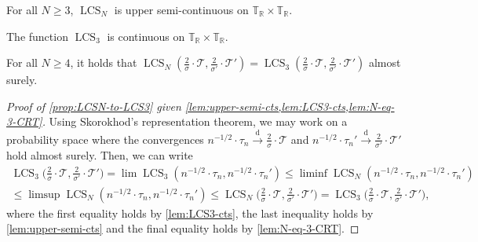 \documentclass[11pt,reqno]{amsart}
\newcommand{\R}{\mathbb{R}}
\newcommand{\bbT}{\mathbb{T}}
\newcommand{\1}{\mathbf{1}}
\newcommand{\0}{\mathbf{0}}
\newcommand{\sT}{\mathscr{T}}
\newcommand{\convdist}{\ensuremath{\stackrel{\mathrm{d}}{\rightarrow}}}
\newcommand{\LCS}{\operatorname{LCS}}
\begin{document}
\begin{lem}\label{lem:upper-semi-cts}
    For all $N\geq 3$, $\LCS_N$ is upper semi-continuous on $\bbT_\R\times\bbT_\R$.
\end{lem}
\begin{lem}\label{lem:LCS3-cts}
The function $\LCS_3$ is continuous on $\bbT_\R\times\bbT_\R$.
\end{lem}
\begin{lem}\label{lem:N-eq-3-CRT} 
For all $N\geq 4$, it holds that $\LCS_N(\frac{2}{\sigma}\cdot\sT,\frac{2}{\sigma'}\cdot\sT')=\LCS_3(\frac{2}{\sigma}\cdot\sT,\frac{2}{\sigma'}\cdot\sT')$ almost surely.
\end{lem}




\begin{proof}[Proof of \cref{prop:LCSN-to-LCS3} given \cref{lem:upper-semi-cts,lem:LCS3-cts,lem:N-eq-3-CRT}] Using Skorokhod's representation theorem, we may work on a probability space where the convergences $n^{-1/2}\cdot\tau_n \convdist \frac{2}{\sigma}\cdot\sT$ and $n^{-1/2}\cdot\tau_n' \convdist \frac{2}{\sigma'}\cdot\sT'$ hold almost surely. Then, we can write
\begin{multline*}
\LCS_3\big(\tfrac{2}{\sigma}\cdot\sT,\tfrac{2}{\sigma'}\cdot\sT'\big)=\lim \LCS_3(n^{-1/2}\cdot\tau_n,n^{-1/2}\cdot\tau_n')\leq \liminf \LCS_N(n^{-1/2}\cdot\tau_n,n^{-1/2}\cdot\tau_n')\\
\leq \limsup \LCS_N(n^{-1/2}\cdot\tau_n,n^{-1/2}\cdot\tau_n')\leq \LCS_N\big(\tfrac{2}{\sigma}\cdot\sT,\tfrac{2}{\sigma'}\cdot\sT'\big)=\LCS_3\big(\tfrac{2}{\sigma}\cdot\sT,\tfrac{2}{\sigma'}\cdot\sT'\big),
\end{multline*}
where the first equality holds by \cref{lem:LCS3-cts}, the last inequality holds by \cref{lem:upper-semi-cts} and the final equality holds by \cref{lem:N-eq-3-CRT}.
\end{proof}
\end{document}
